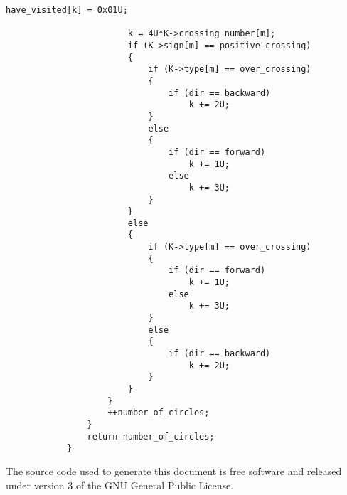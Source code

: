 \documentclass{article}
\theoremstyle{plain}
\begin{document}
\begin{lstlisting}[style=CStyle, gobble=12]
                        have_visited[k] = 0x01U;

                        k = 4U*K->crossing_number[m];
                        if (K->sign[m] == positive_crossing)
                        {
                            if (K->type[m] == over_crossing)
                            {
                                if (dir == backward)
                                    k += 2U;
                            }
                            else
                            {
                                if (dir == forward)
                                    k += 1U;
                                else
                                    k += 3U;
                            }
                        }
                        else
                        {
                            if (K->type[m] == over_crossing)
                            {
                                if (dir == forward)
                                    k += 1U;
                                else
                                    k += 3U;
                            }
                            else
                            {
                                if (dir == backward)
                                    k += 2U;
                            }
                        }
                    }
                    ++number_of_circles;
                }
                return number_of_circles;
            }
        \end{lstlisting}
    \newpage
    
    
    \newpage
    The source code used to generate this document is free software and released
    under version 3 of the GNU General Public License.
\end{document}
